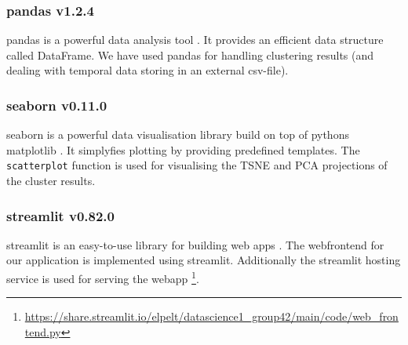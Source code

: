 \subsubsection[pandas]{pandas v1.2.4}
pandas is a powerful data analysis tool \cite{mckinney-proc-scipy-2010, reback2020pandas}. It provides an efficient data structure called DataFrame. We have used pandas for handling clustering results (and dealing with temporal data storing in an external csv-file). 

\subsubsection[seaborn]{seaborn v0.11.0}
seaborn is a powerful data visualisation library build on top of pythons matplotlib \cite{seaborn}. It simplyfies plotting by providing predefined templates.  The \texttt{scatterplot} function is used for visualising the TSNE and PCA projections of the cluster results.

\subsubsection[streamlit]{streamlit v0.82.0}
streamlit is an easy-to-use library for building web apps \cite{streamlit}. The webfrontend for our application is implemented using streamlit. Additionally the streamlit hosting service is used for serving the webapp \footnote{\url{https://share.streamlit.io/elpelt/datascience1_group42/main/code/web_frontend.py}}.
